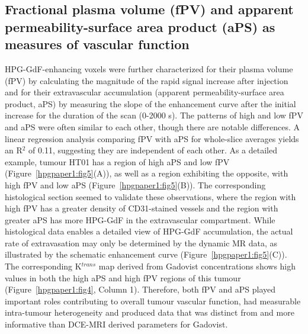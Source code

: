 \subsection{Fractional plasma volume (\acs{fPV}) and apparent permeability-surface area product (\acs{aPS}) as measures of vascular function}

\acs{HPG-GdF}-enhancing voxels were further characterized for their plasma volume (\acs{fPV}) by calculating the magnitude of the rapid signal increase after injection and for their extravascular accumulation (apparent permeability-surface area product, \acs{aPS}) by measuring the slope of the enhancement curve after the initial increase for the duration of the scan (0-2000 s).
The patterns of high and low \acs{fPV} and \acs{aPS} were often similar to each other, though there are notable differences.
A linear regression analysis comparing \acs{fPV} with \acs{aPS} for whole-slice averages yields an R$^2$ of 0.11, suggesting they are independent of each other.
As a detailed example, tumour HT01 has a region of high \acs{aPS} and low \acs{fPV} (Figure~\ref{hpgpaper1:fig5}(A)), as well as a region exhibiting the opposite, with high \acs{fPV} and low \acs{aPS} (Figure~\ref{hpgpaper1:fig5}(B)).
The corresponding histological section seemed to validate these observations, where the region with high \acs{fPV} has a greater density of \acs{CD31}-stained vessels and the region with greater \acs{aPS} has more \acs{HPG-GdF} in the extravascular compartment.
While histological data enables a detailed view of \acs{HPG-GdF} accumulation, the actual rate of extravasation may only be determined by the dynamic MR data, as illustrated by the schematic enhancement curve (Figure~\ref{hpgpaper1:fig5}(C)).
The corresponding K$^{trans}$ map derived from Gadovist concentrations shows high values in both the high \acs{aPS} and high \acs{fPV} regions of this tumour (Figure~\ref{hpgpaper1:fig4}, Column 1).
Therefore, both \acs{fPV} and \acs{aPS} played important roles contributing to overall tumour vascular function, had measurable intra-tumour heterogeneity and produced data that was distinct from and more informative than \acs{DCE-MRI} derived parameters for Gadovist.

